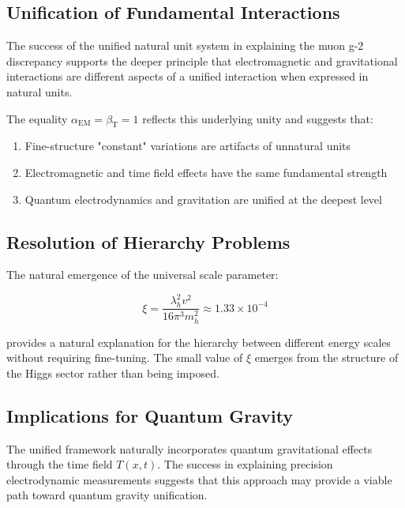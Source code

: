 \documentclass[12pt,a4paper]{article}
\newcommand{\Tfieldt}{T(x,t)}
\newcommand{\alphaEM}{\alpha_{\text{EM}}}
\newcommand{\betaT}{\beta_{\text{T}}}
\newcommand{\xipar}{\xi}
\begin{document}
	\subsection{Unification of Fundamental Interactions}
	\label{subsec:fundamental_unification}
	
	The success of the unified natural unit system in explaining the muon g-2 discrepancy supports the deeper principle that electromagnetic and gravitational interactions are different aspects of a unified interaction when expressed in natural units.
	
	The equality $\alphaEM = \betaT = 1$ reflects this underlying unity and suggests that:
	
	\begin{enumerate}
		\item Fine-structure "constant" variations are artifacts of unnatural units
		\item Electromagnetic and time field effects have the same fundamental strength
		\item Quantum electrodynamics and gravitation are unified at the deepest level
	\end{enumerate}
	
	\subsection{Resolution of Hierarchy Problems}
	\label{subsec:hierarchy_resolution}
	
	The natural emergence of the universal scale parameter:
	
	\begin{equation}
		\xipar = \frac{\lambda_h^2 v^2}{16\pi^3 m_h^2} \approx 1.33 \times 10^{-4}
	\end{equation}
	
	provides a natural explanation for the hierarchy between different energy scales without requiring fine-tuning. The small value of $\xipar$ emerges from the structure of the Higgs sector rather than being imposed.
	
	\subsection{Implications for Quantum Gravity}
	\label{subsec:quantum_gravity}
	
	The unified framework naturally incorporates quantum gravitational effects through the time field $\Tfieldt$. The success in explaining precision electrodynamic measurements suggests that this approach may provide a viable path toward quantum gravity unification.
	
\end{document}
